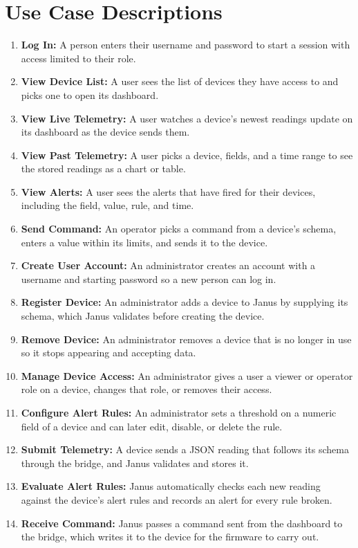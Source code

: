 \documentclass[11pt]{article}
\begin{document}
\section{Use Case Descriptions}

\begin{enumerate}[leftmargin=2em, itemsep=0.6em]
\item \textbf{Log In:} A person enters their username and password to start a session with access limited to their role.
\item \textbf{View Device List:} A user sees the list of devices they have access to and picks one to open its dashboard.
\item \textbf{View Live Telemetry:} A user watches a device's newest readings update on its dashboard as the device sends them.
\item \textbf{View Past Telemetry:} A user picks a device, fields, and a time range to see the stored readings as a chart or table.
\item \textbf{View Alerts:} A user sees the alerts that have fired for their devices, including the field, value, rule, and time.
\item \textbf{Send Command:} An operator picks a command from a device's schema, enters a value within its limits, and sends it to the device.
\item \textbf{Create User Account:} An administrator creates an account with a username and starting password so a new person can log in.
\item \textbf{Register Device:} An administrator adds a device to Janus by supplying its schema, which Janus validates before creating the device.
\item \textbf{Remove Device:} An administrator removes a device that is no longer in use so it stops appearing and accepting data.
\item \textbf{Manage Device Access:} An administrator gives a user a viewer or operator role on a device, changes that role, or removes their access.
\item \textbf{Configure Alert Rules:} An administrator sets a threshold on a numeric field of a device and can later edit, disable, or delete the rule.
\item \textbf{Submit Telemetry:} A device sends a JSON reading that follows its schema through the bridge, and Janus validates and stores it.
\item \textbf{Evaluate Alert Rules:} Janus automatically checks each new reading against the device's alert rules and records an alert for every rule broken.
\item \textbf{Receive Command:} Janus passes a command sent from the dashboard to the bridge, which writes it to the device for the firmware to carry out.
\end{enumerate}
\end{document}

